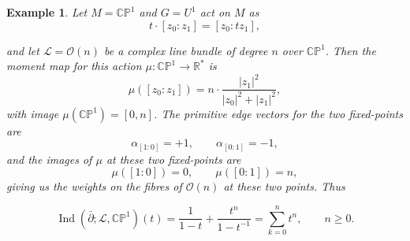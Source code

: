 \documentclass{article}
\newtheorem{example}{Example}
\newcommand{\ra}{\rightarrow}
\newcommand{\PP}{\mathbb{P}}
\newcommand{\RR}{\mathbb{R}}
\newcommand{\CC}{\mathbb{C}}
\newcommand{\mcL}{\mathcal{L}}
\newcommand{\mcO}{\mathcal{O}}
\newcommand{\mc}[1]{\mathcal{#1}}
\DeclareMathOperator{\Ind}{Ind}
\begin{document}
\begin{example}
	Let $M = \CC\PP^{1}$ and $G = U^{1}$ act on $M$ as
	\begin{equation*}
		t \cdot [z_{0}: z_{1}] = [z_{0} : tz_{1}],
	\end{equation*}

	and let $\mcL = \mcO(n)$ be a complex line bundle of degree $n$ over $\CC\PP^{1}$. Then the moment map for this action $\mu : \CC\PP^{1} \ra \RR^{\ast}$ is
	\begin{equation*}
		\mu([z_{0}:z_{1}]) = n\cdot\frac{|z_{1}|^{2}}{|z_{0}|^{2} + |z_{1}|^{2}},
	\end{equation*}
	with image $\mu(\CC\PP^{1}) = [0, n]$. The primitive edge vectors for the two fixed-points are
	\begin{equation*}
		\alpha_{[1:0]} = +1, \qquad \alpha_{[0:1]} = -1,
	\end{equation*}
	and the images of $\mu$ at these two fixed-points are
	\begin{equation*}
		 \mu([1:0]) = 0, \qquad \mu([0:1]) = n,
	\end{equation*}
	giving us the weights on the fibres of $\mc{O}(n)$ at these two points. Thus
	
	\begin{equation*}
		\Ind(\bar{\partial}; \mcL, \CC\PP^{1})(t) = \frac{1}{1 - t} + \frac{t^{n}}{1 - t^{-1}} = \sum_{k = 0}^{n}t^{n}, \qquad n \geq 0.
	\end{equation*}

\end{example}
\end{document}
